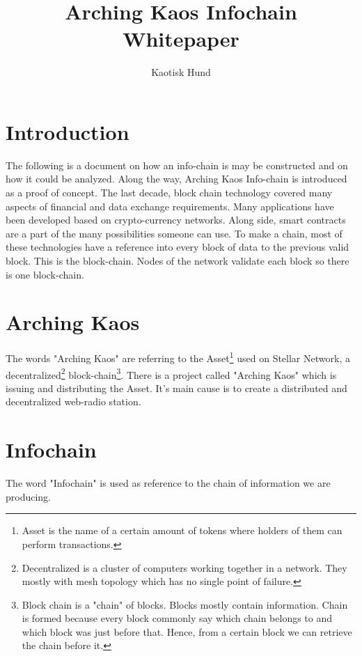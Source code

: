 \documentclass[10pt,a4paper,twocolumn]{paper}
\title{Arching Kaos Infochain Whitepaper}
\author{Kaotisk Hund}
\begin{document}
	\maketitle
	\begin{abstract}
		
	\end{abstract}
	\tableofcontents
	\section{Introduction}\label{Introduction}
	The following is a document on how an info-chain is may be constructed and on how it could be analyzed. Along the way, Arching Kaos Info-chain is introduced as a proof of concept. The last decade, block chain technology covered many aspects of financial and data exchange requirements. Many applications have been developed based on crypto-currency networks. Along side, smart contracts are a part of the many possibilities someone can use. To make a chain, most of these technologies have a reference into every block of data to the previous valid block. This is the block-chain. Nodes of the network validate each block so there is one block-chain.


	\section{Arching Kaos}\label{arching-kaos}
	The words "Arching Kaos" are referring to the Asset\footnote{Asset is the name of a certain amount of tokens where holders of them can perform transactions.} used on Stellar Network, a decentralized\footnote{Decentralized is a cluster of computers working together in a network. They mostly with mesh topology which has no single point of failure.} block-chain\footnote{Block chain is a "chain" of blocks. Blocks mostly contain information. Chain is formed because every block commonly say which chain belongs to and which block was just before that. Hence, from a certain block we can retrieve the chain before it.}. There is a project called "Arching Kaos" which is issuing and distributing the Asset. It's main cause is to create a distributed and decentralized web-radio station.
	
	\section{Infochain}\label{infochain}
	The word "Infochain" is used as reference to the chain of information we are producing.
		
\end{document}
